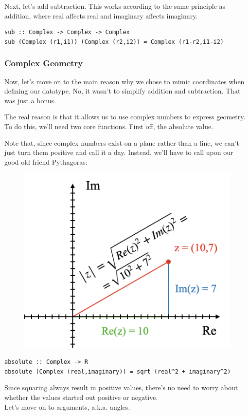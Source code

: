 Next, let's add subtraction. This works according to the same principle as addition, where real affects real and imaginary affects imaginary.   
\begin{verbatim}
sub :: Complex -> Complex -> Complex
sub (Complex (r1,i1)) (Complex (r2,i2)) = Complex (r1-r2,i1-i2)
\end{verbatim}

\subsubsection{Complex Geometry}

Now, let's move on to the main reason why we chose to mimic coordinates when defining our datatype. No, it wasn't to simplify addition and subtraction. That was just a bonus.

The real reason is that it allows us to use complex numbers to express geometry. To do this, we'll need two core functions. First off, the absolute value.

Note that, since complex numbers exist on a plane rather than a line, we can't just turn them positive and call it a day. Instead, we'll have to call upon our good old friend Pythagoras:

\begin{figure}[h!]
    \centering
    \includegraphics[scale= 0.4]{abs.png}
    \caption{}
    \label{abs}
\end{figure}

\begin{verbatim}
absolute :: Complex -> R
absolute (Complex (real,imaginary)) = sqrt (real^2 + imaginary^2)
\end{verbatim}
Since squaring always result in positive values, there's no need to worry about whether the values started out positive or negative.\\
Let's move on to arguments, a.k.a. angles.

